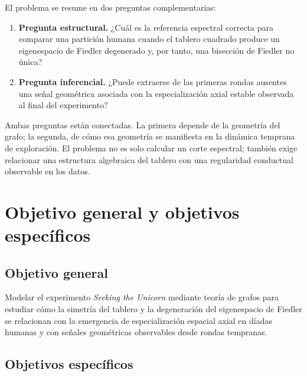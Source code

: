 \documentclass[journal]{IEEEtran}
\begin{document}
El problema se resume en dos preguntas complementarias:
\begin{enumerate}
\item \textbf{Pregunta estructural.} ¿Cuál es la referencia espectral correcta para comparar una partición humana cuando el tablero cuadrado produce un eigenespacio de Fiedler degenerado y, por tanto, una bisección de Fiedler no única?
\item \textbf{Pregunta inferencial.} ¿Puede extraerse de las primeras rondas ausentes una señal geométrica asociada con la especialización axial estable observada al final del experimento?
\end{enumerate}

Ambas preguntas están conectadas. La primera depende de la geometría del grafo; la segunda, de cómo esa geometría se manifiesta en la dinámica temprana de exploración. El problema no es solo calcular un corte espectral; también exige relacionar una estructura algebraica del tablero con una regularidad conductual observable en los datos.

\section{Objetivo general y objetivos específicos}\label{sec:objetivos}

\subsection{Objetivo general}

Modelar el experimento \emph{Seeking the Unicorn} mediante teoría de grafos para estudiar cómo la simetría del tablero y la degeneración del eigenespacio de Fiedler se relacionan con la emergencia de especialización espacial axial en díadas humanas y con señales geométricas observables desde rondas tempranas.

\subsection{Objetivos específicos}
\end{document}
